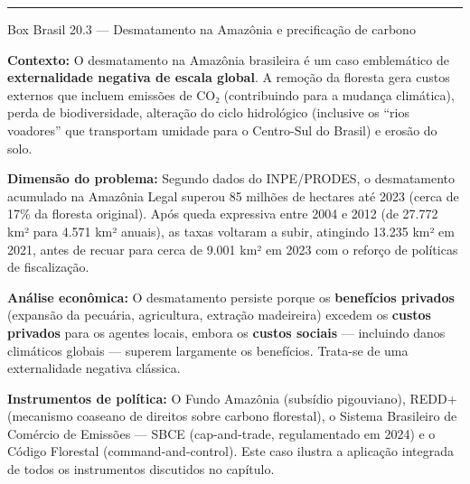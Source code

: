 \documentclass[11pt,twoside,openright]{book}
\begin{document}
\begin{center}\rule{0.5\linewidth}{0.5pt}\end{center}

\begin{boxbrasilbox}{Box Brasil 20.3 — Desmatamento na Amazônia e precificação de carbono}

\textbf{Contexto:} O desmatamento na Amazônia brasileira é um caso
emblemático de \textbf{externalidade negativa de escala global}. A
remoção da floresta gera custos externos que incluem emissões de CO₂
(contribuindo para a mudança climática), perda de biodiversidade,
alteração do ciclo hidrológico (inclusive os ``rios voadores'' que
transportam umidade para o Centro-Sul do Brasil) e erosão do solo.

\textbf{Dimensão do problema:} Segundo dados do INPE/PRODES, o
desmatamento acumulado na Amazônia Legal superou 85 milhões de hectares
até 2023 (cerca de 17\% da floresta original). Após queda expressiva
entre 2004 e 2012 (de 27.772 km² para 4.571 km² anuais), as taxas
voltaram a subir, atingindo 13.235 km² em 2021, antes de recuar para
cerca de 9.001 km² em 2023 com o reforço de políticas de fiscalização.

\textbf{Análise econômica:} O desmatamento persiste porque os
\textbf{benefícios privados} (expansão da pecuária, agricultura,
extração madeireira) excedem os \textbf{custos privados} para os agentes
locais, embora os \textbf{custos sociais} --- incluindo danos climáticos
globais --- superem largamente os benefícios. Trata-se de uma
externalidade negativa clássica.

\textbf{Instrumentos de política:} O Fundo Amazônia (subsídio
pigouviano), REDD+ (mecanismo coaseano de direitos sobre carbono
florestal), o Sistema Brasileiro de Comércio de Emissões --- SBCE
(cap-and-trade, regulamentado em 2024) e o Código Florestal
(command-and-control). Este caso ilustra a aplicação integrada de todos
os instrumentos discutidos no capítulo.

\end{boxbrasilbox}
\end{document}
